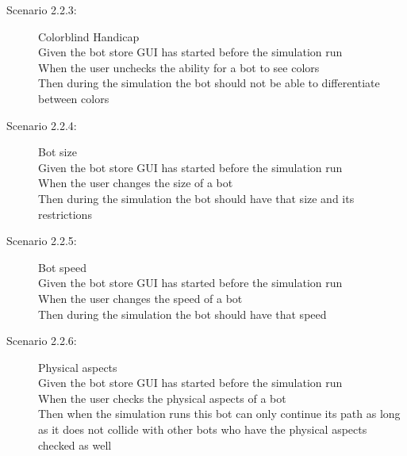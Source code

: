 \begin{description}
\begin{description}
    \item[Scenario 2.2.3:] Colorblind Handicap\\
    Given the bot store GUI has started before the simulation run\\
    When the user unchecks the ability for a bot to see colors\\
    Then during the simulation the bot should not be able to differentiate between colors

    \item[Scenario 2.2.4:] Bot size\\
    Given the bot store GUI has started before the simulation run\\
    When the user changes the size of a bot\\
    Then during the simulation the bot should have that size and its restrictions

    \item[Scenario 2.2.5:] Bot speed\\
    Given the bot store GUI has started before the simulation run\\
    When the user changes the speed of a bot\\
    Then during the simulation the bot should have that speed

    \item[Scenario 2.2.6:] Physical aspects\\
    Given the bot store GUI has started before the simulation run\\
    When the user checks the physical aspects of a bot\\
    Then when the simulation runs this bot can only continue its path as long as it does not collide with other bots who have the physical aspects checked as well
  \end{description}
\end{description}

